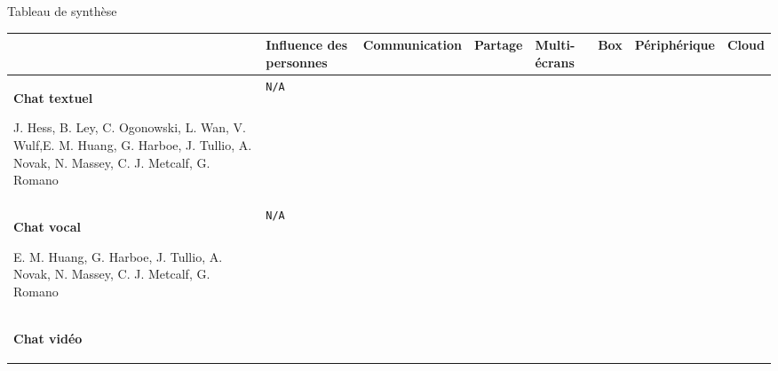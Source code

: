 \documentclass{beamer}
\newcommand{\xmark}{\ding{55}}%
\newcommand{\cmark}{\ding{51}}%
\begin{document}
	\section*{}
	\hspace{-25px}
	\begin{frame}{\hspace{10px}Tableau de synthèse}
		\begin{table}[H]
		\tiny
		\begin{tabular}{|p{1.4cm}|p{1.45cm}|p{0.7cm}|p{0.6cm}|p{0.6cm}|p{0.25cm}|p{1.1cm}|p{0.6cm}|}
			\hline
			&\textbf{Influence des personnes} &\textbf{Commu\-nication} &\textbf{Partage} &\textbf{Multi-écrans} &\textbf{Box} &\textbf{Périphérique} &\textbf{Cloud}\\
			\hline
			\begin{minipage}{1.4cm}
				\vspace{0.5px}
				\textbf{Chat textuel}\newline
			\vspace{-12px}
			\begin{flushleft}
			\fontsize{4.0}{4}\selectfont 
			J. Hess, B. Ley, C. Ogonowski, L. Wan, V. Wulf,E. M. Huang, G. Harboe, J. Tullio, A. Novak, N. Massey, C. J.
			Metcalf, G. Romano
		\end{flushleft}
			\end{minipage}	
			\vspace{2px}
			& \texttt{N/A} &\cmark&\cmark&\cmark&\cmark&\cmark&\cmark\\
			\hline
			\begin{minipage}{1.4cm}
				\vspace{0.5px}
				\textbf{Chat vocal} \newline
			\vspace{-12px}
			\begin{flushleft}
			\fontsize{4}{4}\selectfont
			E. M. Huang, G. Harboe, J. Tullio, A. Novak, N. Massey, C. J. Metcalf, G. Romano
		\end{flushleft}
		\end{minipage}
			\vspace{2px}
		& \texttt{N/A} &\xmark&\cmark&\xmark&\cmark&\xmark & \cmark \\
			\hline
			\begin{minipage}{1.4cm}
				\vspace{0.5px}
				\textbf{Chat vidéo}\newline
			\vspace{-12px}
			\begin{flushleft}
			\fontsize{4}{4}\selectfont

\end{flushleft}
\end{minipage}
\end{tabular}
\end{table}
\end{frame}
\end{document}
